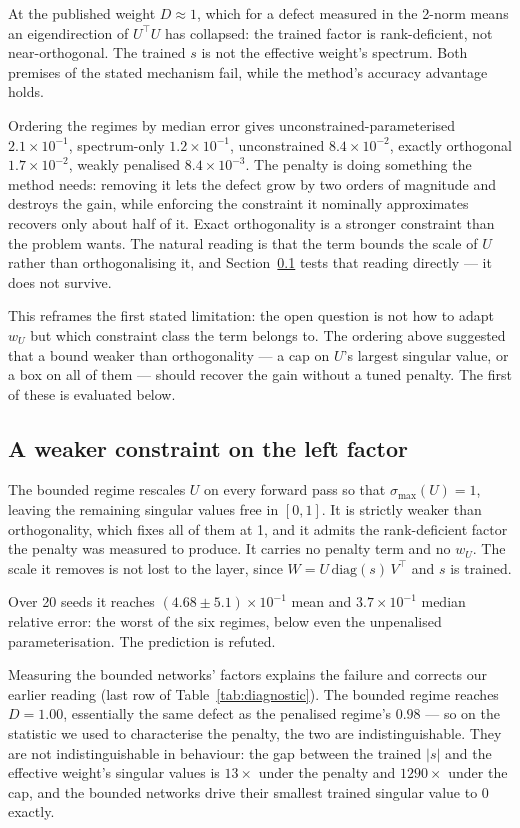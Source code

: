 \documentclass[11pt]{article}
\newcommand{\DU}{D}
\newcommand{\wU}{w_U}
\begin{document}
At the published weight $\DU \approx 1$, which for a defect measured in the
2-norm means an eigendirection of $U^\top U$ has collapsed: the trained factor
is rank-deficient, not near-orthogonal. The trained $s$ is not the effective
weight's spectrum. Both premises of the stated mechanism fail, while the
method's accuracy advantage holds.

Ordering the regimes by median error gives unconstrained-parameterised
$2.1\times10^{-1}$, spectrum-only $1.2\times10^{-1}$, unconstrained
$8.4\times10^{-2}$, exactly orthogonal $1.7\times10^{-2}$, weakly penalised
$8.4\times10^{-3}$. The penalty is doing something the method needs: removing
it lets the defect grow by two orders of magnitude and destroys the gain, while
enforcing the constraint it nominally approximates recovers only about half of
it. Exact orthogonality is a stronger constraint than the problem wants. The
natural reading is that the term bounds the scale of $U$ rather than
orthogonalising it, and Section~\ref{sec:bounded} tests that reading
directly --- it does not survive.

This reframes the first stated limitation: the open question is not how to
adapt $\wU$ but which constraint class the term belongs to. The ordering above
suggested that a bound weaker than orthogonality --- a cap on $U$'s largest
singular value, or a box on all of them --- should recover the gain without a
tuned penalty. The first of these is evaluated below.

\subsection{A weaker constraint on the left factor}
\label{sec:bounded}

The bounded regime rescales $U$ on every forward pass so that
$\sigma_{\max}(U) = 1$, leaving the remaining singular values free in $[0,1]$.
It is strictly weaker than orthogonality, which fixes all of them at 1, and it
admits the rank-deficient factor the penalty was measured to produce. It
carries no penalty term and no $\wU$. The scale it removes is not lost to the
layer, since $W = U\,\mathrm{diag}(s)\,V^\top$ and $s$ is trained.

Over 20 seeds it reaches $(4.68\pm5.1)\times10^{-1}$ mean and
$3.7\times10^{-1}$ median relative error: the worst of the six regimes, below
even the unpenalised parameterisation. The prediction is refuted.

Measuring the bounded networks' factors explains the failure and corrects our
earlier reading (last row of Table~\ref{tab:diagnostic}). The bounded regime
reaches $\DU = 1.00$, essentially the same defect as the penalised regime's
$0.98$ --- so on the statistic we used to characterise the penalty, the two are
indistinguishable. They are not indistinguishable in behaviour: the gap between
the trained $|s|$ and the effective weight's singular values is $13\times$ under
the penalty and $1290\times$ under the cap, and the bounded networks drive their
smallest trained singular value to $0$ exactly.
\end{document}
